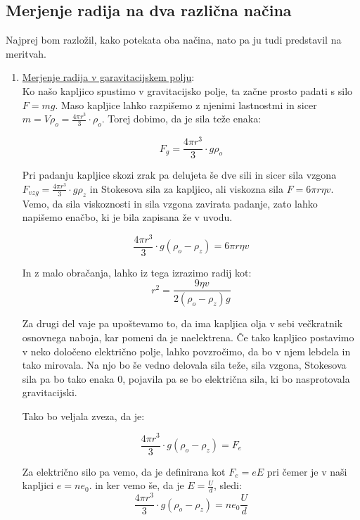 \documentclass[11pt, a4paper]{article}
\theoremstyle{definition}
\theoremstyle{example}
\theoremstyle{izrek}
\begin{document}
\subsection{Merjenje radija na dva različna načina}
Najprej bom razložil, kako potekata oba načina, nato pa ju tudi predstavil na meritvah.
\begin{enumerate}
\item \underline{Merjenje radija v garavitacijskem polju}:  \\

Ko našo kapljico spustimo v gravitacijsko polje, ta začne prosto padati s silo $F=mg$. Maso kapljice lahko razpišemo z njenimi lastnostmi in sicer $m=V\rho_o=\frac{4\pi r^3}{3}\cdot \rho_o$. Torej dobimo, da je sila teže enaka:

$$F_g=\frac{4\pi r^3}{3}\cdot g \rho_o$$

Pri padanju kapljice skozi zrak pa delujeta še dve sili in sicer sila vzgona $F_{vzg}=\frac{4\pi r^3}{3}\cdot g \rho_z$ in Stokesova sila za kapljico, ali viskozna sila $F=6\pi r \eta v$. \\
Vemo, da sila viskoznosti in sila vzgona zavirata padanje, zato lahko napišemo enačbo, ki je bila zapisana že v uvodu. 

$$\frac{4\pi r^3}{3}\cdot g (\rho_o-\rho_z)=6\pi r \eta v$$

In z malo obračanja, lahko iz tega izrazimo radij kot: 
\begin{equation}
r^2=\frac{9\eta v}{2(\rho_o-\rho_z) g}
\label{Radij v gravitacijskem}
\end{equation}

Za drugi del vaje pa upoštevamo to, da ima kapljica olja v sebi večkratnik osnovnega naboja, kar pomeni da je naelektrena. Če tako kapljico postavimo v neko določeno električno polje, lahko povzročimo, da bo v njem lebdela in tako mirovala. Na njo bo še vedno delovala sila teže, sila vzgona, Stokesova sila pa bo tako enaka 0, pojavila pa se bo električna sila, ki bo nasprotovala gravitacijski.

\pagebreak 
Tako bo veljala zveza, da je: 

$$\frac{4\pi r^3}{3}\cdot g (\rho_o-\rho_z)=F_e$$

Za električno silo pa vemo, da je definirana kot $F_e=eE$ pri čemer je v naši kapljici $e=ne_0$. in ker vemo še, da je $E=\frac{U}{d}$, sledi:
\begin{equation}
\frac{4\pi r^3}{3}\cdot g (\rho_o-\rho_z)=ne_0\frac{U}{d}
\label{Naboj v gravitacijskem}
\end{equation}



\end{enumerate}
\end{document}
